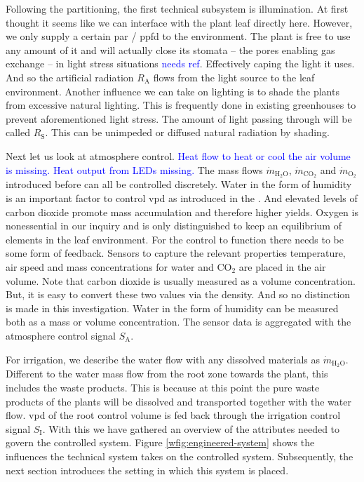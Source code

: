 Following the partitioning, the first technical subsystem is illumination.
At first thought it seems like we can interface with the plant leaf directly here.
However, we only supply a certain \ac{par} / \ac{ppfd} to the environment.
The plant is free to use any amount of it and will actually close its stomata -- the pores enabling gas exchange -- in light stress situations \textcolor{Blue}{needs ref}.
Effectively caping the light it uses.
And so the artificial radiation $R_\text{A}$ flows from the light source to the leaf environment.
Another influence we can take on lighting is to shade the plants from excessive natural lighting.
This is frequently done in existing greenhouses to prevent aforementioned light stress.
The amount of light passing through will be called $R_\text{S}$.
This can be unimpeded or diffused natural radiation by shading.

Next let us look at atmosphere control.
\textcolor{Blue}{Heat flow to heat or cool the air volume is missing.}
\textcolor{Blue}{Heat output from LEDs missing.}
The mass flows $\dot{m}_{\text{H}_2\text{O}}$, $\dot{m}_{\text{CO}_2}$ and $\dot{m}_{\text{O}_2}$ introduced before can all be controlled discretely.
Water in the form of humidity is an important factor to control \ac{vpd} as introduced in the .
And elevated levels of carbon dioxide promote mass accumulation and therefore higher yields.
Oxygen is nonessential in our inquiry and is only distinguished to keep an equilibrium of elements in the leaf environment.
For the control to function there needs to be some form of feedback.
Sensors to capture the relevant properties temperature, air speed and mass concentrations for water and CO$_2$ are placed in the air volume.
Note that carbon dioxide is usually measured as a volume concentration.
But, it is easy to convert these two values via the density.
And so no distinction is made in this investigation.
Water in the form of humidity can be measured both as a mass or volume concentration.
The sensor data is aggregated with the atmosphere control signal $S_\text{A}$.

For irrigation, we describe the water flow with any dissolved materials as $\dot{m}_{\text{H}_2\text{O}}$.
Different to the water mass flow from the root zone towards the plant, this includes the waste products.
This is because at this point the pure waste products of the plants will be dissolved and transported together with the water flow.
\ac{vpd} of the root control volume is fed back through the irrigation control signal $S_\text{I}$.
With this we have gathered an overview of the attributes needed to govern the controlled system.
Figure \ref{wfig:engineered-system} shows the influences the technical system takes on the controlled system.
Subsequently, the next section introduces the setting in which this system is placed.

